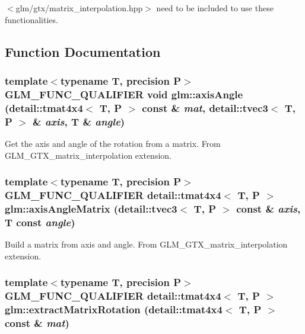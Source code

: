 $<$glm/gtx/matrix\_\-interpolation.hpp$>$ need to be included to use these functionalities. 

\subsection{Function Documentation}
\hypertarget{group__gtx__matrix__interpolation_g16474d44af6a32a07c50df2409526d95}{
\subsubsection[axisAngle]{\setlength{\rightskip}{0pt plus 5cm}template$<$typename T, precision P$>$ GLM\_\-FUNC\_\-QUALIFIER void glm::axisAngle (detail::tmat4x4$<$ T, P $>$ const \& {\em mat}, \/  detail::tvec3$<$ T, P $>$ \& {\em axis}, \/  T \& {\em angle})}}
\label{group__gtx__matrix__interpolation_g16474d44af6a32a07c50df2409526d95}


Get the axis and angle of the rotation from a matrix. From GLM\_\-GTX\_\-matrix\_\-interpolation extension. \hypertarget{group__gtx__matrix__interpolation_gf7c0106d03d55a7b670a6261b107f22b}{
\subsubsection[axisAngleMatrix]{\setlength{\rightskip}{0pt plus 5cm}template$<$typename T, precision P$>$ GLM\_\-FUNC\_\-QUALIFIER detail::tmat4x4$<$ T, P $>$ glm::axisAngleMatrix (detail::tvec3$<$ T, P $>$ const \& {\em axis}, \/  T const  {\em angle})}}
\label{group__gtx__matrix__interpolation_gf7c0106d03d55a7b670a6261b107f22b}


Build a matrix from axis and angle. From GLM\_\-GTX\_\-matrix\_\-interpolation extension. \hypertarget{group__gtx__matrix__interpolation_gf559937fe5cea133f5e7f3c228255960}{
\subsubsection[extractMatrixRotation]{\setlength{\rightskip}{0pt plus 5cm}template$<$typename T, precision P$>$ GLM\_\-FUNC\_\-QUALIFIER detail::tmat4x4$<$ T, P $>$ glm::extractMatrixRotation (detail::tmat4x4$<$ T, P $>$ const \& {\em mat})}}
\label{group__gtx__matrix__interpolation_gf559937fe5cea133f5e7f3c228255960}


